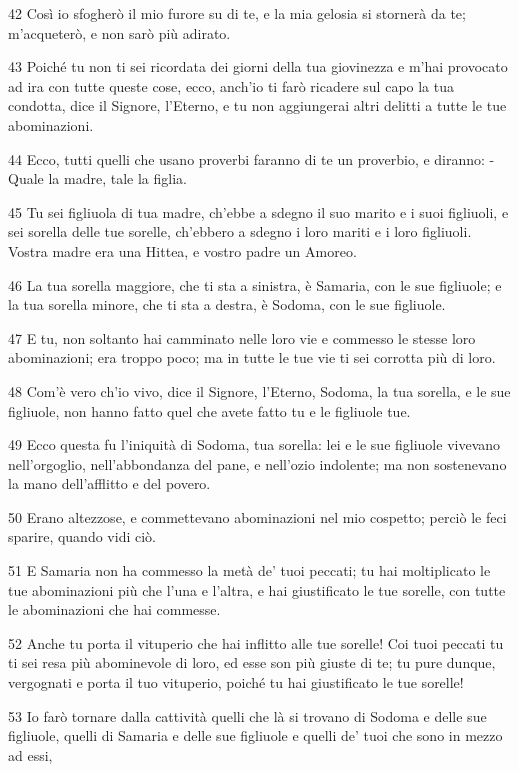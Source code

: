 \par 42 Così io sfogherò il mio furore su di te, e la mia gelosia si stornerà da te; m'acqueterò, e non sarò più adirato.
\par 43 Poiché tu non ti sei ricordata dei giorni della tua giovinezza e m'hai provocato ad ira con tutte queste cose, ecco, anch'io ti farò ricadere sul capo la tua condotta, dice il Signore, l'Eterno, e tu non aggiungerai altri delitti a tutte le tue abominazioni.
\par 44 Ecco, tutti quelli che usano proverbi faranno di te un proverbio, e diranno: - Quale la madre, tale la figlia.
\par 45 Tu sei figliuola di tua madre, ch'ebbe a sdegno il suo marito e i suoi figliuoli, e sei sorella delle tue sorelle, ch'ebbero a sdegno i loro mariti e i loro figliuoli. Vostra madre era una Hittea, e vostro padre un Amoreo.
\par 46 La tua sorella maggiore, che ti sta a sinistra, è Samaria, con le sue figliuole; e la tua sorella minore, che ti sta a destra, è Sodoma, con le sue figliuole.
\par 47 E tu, non soltanto hai camminato nelle loro vie e commesso le stesse loro abominazioni; era troppo poco; ma in tutte le tue vie ti sei corrotta più di loro.
\par 48 Com'è vero ch'io vivo, dice il Signore, l'Eterno, Sodoma, la tua sorella, e le sue figliuole, non hanno fatto quel che avete fatto tu e le figliuole tue.
\par 49 Ecco questa fu l'iniquità di Sodoma, tua sorella: lei e le sue figliuole vivevano nell'orgoglio, nell'abbondanza del pane, e nell'ozio indolente; ma non sostenevano la mano dell'afflitto e del povero.
\par 50 Erano altezzose, e commettevano abominazioni nel mio cospetto; perciò le feci sparire, quando vidi ciò.
\par 51 E Samaria non ha commesso la metà de' tuoi peccati; tu hai moltiplicato le tue abominazioni più che l'una e l'altra, e hai giustificato le tue sorelle, con tutte le abominazioni che hai commesse.
\par 52 Anche tu porta il vituperio che hai inflitto alle tue sorelle! Coi tuoi peccati tu ti sei resa più abominevole di loro, ed esse son più giuste di te; tu pure dunque, vergognati e porta il tuo vituperio, poiché tu hai giustificato le tue sorelle!
\par 53 Io farò tornare dalla cattività quelli che là si trovano di Sodoma e delle sue figliuole, quelli di Samaria e delle sue figliuole e quelli de' tuoi che sono in mezzo ad essi,
